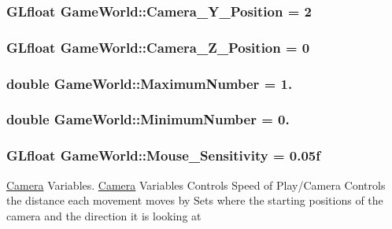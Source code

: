 \subsubsection[{Camera\+\_\+\+Y\+\_\+\+Position}]{\setlength{\rightskip}{0pt plus 5cm}G\+Lfloat Game\+World\+::\+Camera\+\_\+\+Y\+\_\+\+Position = 2}\label{class_game_world_ae3e7cab30494ff5a8e91dfa7406deb16}
\hypertarget{class_game_world_ad993ea24fbacfc98410894078e916927}{}
\subsubsection[{Camera\+\_\+\+Z\+\_\+\+Position}]{\setlength{\rightskip}{0pt plus 5cm}G\+Lfloat Game\+World\+::\+Camera\+\_\+\+Z\+\_\+\+Position = 0}\label{class_game_world_ad993ea24fbacfc98410894078e916927}
\hypertarget{class_game_world_a1cddcf233625a98581eaeb9fd7c8c574}{}
\subsubsection[{Maximum\+Number}]{\setlength{\rightskip}{0pt plus 5cm}double Game\+World\+::\+Maximum\+Number = 1.}\label{class_game_world_a1cddcf233625a98581eaeb9fd7c8c574}
\hypertarget{class_game_world_a54ccf4cf03172ab8779e9c326c8846ed}{}
\subsubsection[{Minimum\+Number}]{\setlength{\rightskip}{0pt plus 5cm}double Game\+World\+::\+Minimum\+Number = 0.}\label{class_game_world_a54ccf4cf03172ab8779e9c326c8846ed}
\hypertarget{class_game_world_a9bf4eb977e6ab9299aaef1345c4fa4dd}{}
\subsubsection[{Mouse\+\_\+\+Sensitivity}]{\setlength{\rightskip}{0pt plus 5cm}G\+Lfloat Game\+World\+::\+Mouse\+\_\+\+Sensitivity = 0.\+05f}\label{class_game_world_a9bf4eb977e6ab9299aaef1345c4fa4dd}
\hyperlink{class_camera}{Camera} Variables. \hyperlink{class_camera}{Camera} Variables Controls Speed of Play/\+Camera Controls the distance each movement moves by Sets where the starting positions of the camera and the direction it is looking at \hypertarget{class_game_world_a968eb29424b68f7cd79a5896c62e944d}{}
